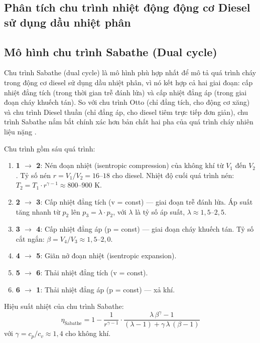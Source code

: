 \documentclass[../main.tex]{subfiles}
\begin{document}
\subsection{Phân tích chu trình nhiệt động động cơ Diesel sử dụng dầu nhiệt phân}
\label{sec:chu-trinh-nhiet-dong}

\subsection{Mô hình chu trình Sabathe (Dual cycle)}
\label{sec:sabathe-model}

Chu trình Sabathe (dual cycle) là mô hình phù hợp nhất để mô tả quá trình cháy trong động cơ diesel sử dụng dầu nhiệt phân, vì nó kết hợp cả hai giai đoạn: cấp nhiệt đẳng tích (trong thời gian trễ đánh lửa) và cấp nhiệt đẳng áp (trong giai đoạn cháy khuếch tán). So với chu trình Otto (chỉ đẳng tích, cho động cơ xăng) và chu trình Diesel thuần (chỉ đẳng áp, cho diesel tiêm trực tiếp đơn giản), chu trình Sabathe nắm bắt chính xác hơn bản chất hai pha của quá trình cháy nhiên liệu nặng \cite{Heywood1988}.

Chu trình gồm sáu quá trình:
\begin{enumerate}
  \item \textbf{1 $\rightarrow$ 2}: Nén đoạn nhiệt (isentropic compression) của không khí từ $V_1$ đến $V_2$. Tỷ số nén $r = V_1/V_2 = 16$--$18$ cho diesel. Nhiệt độ cuối quá trình nén: $T_2 = T_1 \cdot r^{\gamma-1} \approx 800$--$900$ K.
  \item \textbf{2 $\rightarrow$ 3}: Cấp nhiệt đẳng tích (v = const) — giai đoạn trễ đánh lửa. Áp suất tăng nhanh từ $p_2$ lên $p_3 = \lambda \cdot p_2$, với $\lambda$ là tỷ số áp suất, $\lambda \approx 1{,}5$--$2{,}5$.
  \item \textbf{3 $\rightarrow$ 4}: Cấp nhiệt đẳng áp (p = const) — giai đoạn cháy khuếch tán. Tỷ số cắt ngắn: $\beta = V_4/V_3 \approx 1{,}5$--$2{,}0$.
  \item \textbf{4 $\rightarrow$ 5}: Giãn nở đoạn nhiệt (isentropic expansion).
  \item \textbf{5 $\rightarrow$ 6}: Thải nhiệt đẳng tích (v = const).
  \item \textbf{6 $\rightarrow$ 1}: Thải nhiệt đẳng áp (p = const) — xả khí.
\end{enumerate}

Hiệu suất nhiệt của chu trình Sabathe:
\begin{equation}
  \eta_{\text{Sabathe}} = 1 - \frac{1}{r^{\gamma-1}}
  \cdot \frac{\lambda \, \beta^\gamma - 1}
               {(\lambda - 1) + \gamma \, \lambda \, (\beta - 1)}
  \label{eq:sabathe-efficiency}
\end{equation}
với $\gamma = c_p/c_v \approx 1{,}4$ cho không khí.
\end{document}
